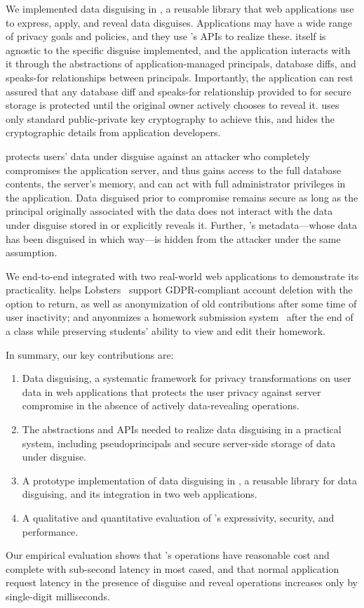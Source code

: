 %
We implemented data disguising in \sys, a reusable library that
web applications use to express, apply, and reveal data disguises.
%
Applications may have a wide range of privacy goals and policies, and they
use \sys's APIs to realize these.
%
\sys itself is agnostic to the specific disguise implemented, and the
application interacts with it through the abstractions of application-managed
principals, database diffs, and speaks-for relationships between principals.
%
Importantly, the application can rest assured that any database diff
and speaks-for relationship provided to \sys for secure storage is protected
until the original owner actively chooses to reveal it.
%
\sys uses only standard public-private key cryptography to achieve this, and
hides the cryptographic details from application developers.
%

%
%
\sys protects users' data under disguise against an attacker who completely
compromises the application server, and thus gains access to the full database
contents, the server's memory, and can act with full administrator privileges
in the application.
%
Data disguised prior to compromise remains secure as long as the principal
originally associated with the data does not interact with the data under
disguise stored in \sys or explicitly reveals it.
%
Further, \sys's metadata---\eg whose data has been disguised in which way---is
hidden from the attacker under the same assumption.
%

%
%
We end-to-end integrated \sys with two real-world web applications to demonstrate
its practicality.
%
\sys helps Lobsters~\cite{lobsters} support GDPR-compliant account deletion with
the option to return, as well as anonymization of old contributions after some
time of user inactivity; and \sys anyonmizes a homework submission
system~\cite{websubmit-rs-anon} after the end of a class while preserving
students' ability to view and edit their homework.
%

%
%
In summary, our key contributions are:
%
\begin{enumerate}[nosep]
 \item Data disguising, a systematic framework for privacy transformations on
   user data in web applications that protects the user privacy against server
   compromise in the absence of actively data-revealing operations.
 \item The abstractions and APIs needed to realize data disguising in a
  practical system, including pseudoprincipals and secure server-side storage
  of data under disguise.
 \item A prototype implementation of data disguising in \sys, a reusable
  library for data disguising, and its integration in two web applications.
 \item A qualitative and quantitative evaluation of \sys's expressivity,
  security, and performance.
\end{enumerate}
%
Our empirical evaluation shows that \sys's operations have reasonable cost
and complete with sub-second latency in most cased, and that normal application
request latency in the presence of disguise and reveal operations increases
only by single-digit milliseconds.
%

